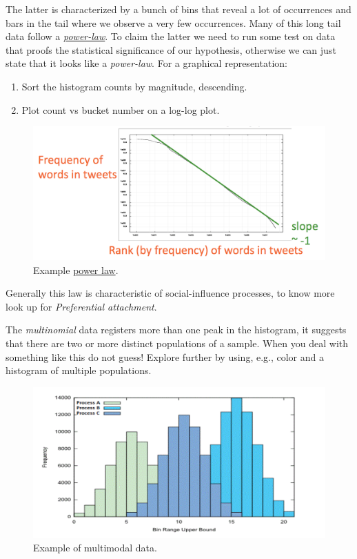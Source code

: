 The latter is characterized by a bunch of bins that reveal a lot of occurrences and bars in the tail where we observe a very few occurrences. Many of this long tail data follow a \href{https://en.wikipedia.org/wiki/Power\_law\#Power-law\_probability\_distributions}{\emph{power-law}}. To claim the latter we need to run some test on data that proofs the statistical significance of our hypothesis, otherwise we can just state that it looks like a \emph{power-law}. For a graphical representation:

\begin{enumerate}
\item Sort the histogram counts by magnitude, descending.
\item Plot count vs bucket number on a log-log plot.
\end{enumerate}


\begin{figure}[H]%
 \centering
 \includegraphics[width=13cm]{./img/06/power_law}
 \caption{\label{pic:power_law} Example \href{https://en.wikipedia.org/wiki/Zipf\%27s\_law}{power law}.}
\end{figure}


Generally this law is characteristic of social-influence processes, to know more look up for \emph{Preferential attachment}.

The \emph{multinomial} data registers more than one peak in the histogram, it suggests that there are two or more distinct populations of a sample. When you deal with something like this do not guess! Explore further by using, e.g., color and a histogram of multiple populations. 


\begin{figure}[H]%
 \centering
 \includegraphics[width=13cm]{./img/06/multimodal}
 \caption{\label{pic:multimodal} Example of multimodal data.}
\end{figure}


